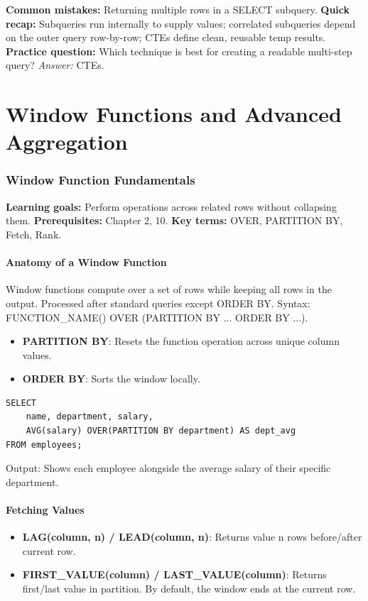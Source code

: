 \documentclass[12pt, a4paper]{article}
\begin{document}
\textbf{Common mistakes:} Returning multiple rows in a SELECT subquery.
\textbf{Quick recap:} Subqueries run internally to supply values; correlated subqueries depend on the outer query row-by-row; CTEs define clean, reusable temp results.
\textbf{Practice question:} Which technique is best for creating a readable multi-step query?
\textit{Answer:} CTEs.

\part{Window Functions and Advanced Aggregation}

\section{Window Function Fundamentals}
\textbf{Learning goals:} Perform operations across related rows without collapsing them.
\textbf{Prerequisites:} Chapter 2, 10.
\textbf{Key terms:} OVER, PARTITION BY, Fetch, Rank.

\subsection{Anatomy of a Window Function}
Window functions compute over a set of rows while keeping all rows in the output. Processed after standard queries except ORDER BY. Syntax: FUNCTION\_NAME() OVER (PARTITION BY ... ORDER BY ...).
\begin{itemize}
    \item \textbf{PARTITION BY}: Resets the function operation across unique column values.
    \item \textbf{ORDER BY}: Sorts the window locally.
\end{itemize}

\begin{verbatim}
SELECT 
    name, department, salary,
    AVG(salary) OVER(PARTITION BY department) AS dept_avg
FROM employees;
\end{verbatim}
Output: Shows each employee alongside the average salary of their specific department.

\subsection{Fetching Values}
\begin{itemize}
    \item \textbf{LAG(column, n) / LEAD(column, n)}: Returns value n rows before/after current row.
    \item \textbf{FIRST\_VALUE(column) / LAST\_VALUE(column)}: Returns first/last value in partition. By default, the window ends at the current row.
\end{itemize}
\end{document}
